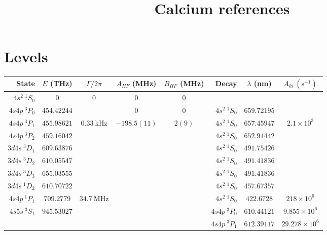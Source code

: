 \documentclass[aps,prx,10pt]{revtex4-2}
\begin{document}
\title{Calcium references}

\maketitle

\section{Levels}
\begin{longtable}{|r|c|c|c|c|r|c|c|}
\hline
State&$E$ (THz)&$\Gamma/2\pi$&$A_{HF}$ (MHz)&$B_{HF}$ (MHz)&Decay&$\lambda$ (nm)&$A_{ki}\ \mathrm{(s^{-1})}$\\
\hline
$4s^2\ {}^{\mathrm{1}}\!S_0$&$0$&$0$&$0$&$0$&&&\\
\hline
$4s4p\ {}^{\mathrm{3}}\!P_0$&$454.42244$&&$0$&$0$&$4s^2\ {}^{\mathrm{1}}\!S_0$&$659.72195$&\\
\hline
$4s4p\ {}^{\mathrm{3}}\!P_1$&$455.98621$&$0.33\ \mathrm{kHz}$\cite{machholmCalculationsPhys.Rev.A2001}&$-198.5(11)$\cite{klingbeilIsotopeZPhysikA1979}&$2(9)$\cite{klingbeilIsotopeZPhysikA1979}&$4s^2\ {}^{\mathrm{1}}\!S_0$&$657.45947$&$2.1\times10^3$\cite{machholmCalculationsPhys.Rev.A2001}\\
\hline
$4s4p\ {}^{\mathrm{3}}\!P_2$&$459.16042$&&&&$4s^2\ {}^{\mathrm{1}}\!S_0$&$652.91442$&\\
\hline
$3d4s\ {}^{\mathrm{3}}\!D_1$&$609.63876$&&&&$4s^2\ {}^{\mathrm{1}}\!S_0$&$491.75426$&\\
\hline
$3d4s\ {}^{\mathrm{3}}\!D_2$&$610.05547$&&&&$4s^2\ {}^{\mathrm{1}}\!S_0$&$491.41836$&\\
\hline
$3d4s\ {}^{\mathrm{3}}\!D_3$&$655.03555$&&&&$4s^2\ {}^{\mathrm{1}}\!S_0$&$491.41836$&\\
\hline
$3d4s\ {}^{\mathrm{1}}\!D_2$&$610.70722$&&&&$4s^2\ {}^{\mathrm{1}}\!S_0$&$457.67357$&\\
\hline
$4s4p\ {}^{\mathrm{1}}\!P_1$&$709.2779$\cite{machholmCalculationsPhys.Rev.A2001}&$34.7\ \mathrm{MHz}$\cite{machholmCalculationsPhys.Rev.A2001}&&&$4s^2\ {}^{\mathrm{1}}\!S_0$&$422.6728$\cite{machholmCalculationsPhys.Rev.A2001}&$218\times10^{6}$\cite{machholmCalculationsPhys.Rev.A2001}\\
\hline
\multirow{3}{*}{$4s5s\ {}^{\mathrm{3}}\!S_1$}&\multirow{3}{*}{$945.53027$}&\multirow{3}{*}{}&\multirow{3}{*}{}&\multirow{3}{*}{}&$4s4p\ {}^{\mathrm{3}}\!P_0$&$610.44121$&$9.855\times10^{6}$\cite{zhouMagicPhys.Rev.A2010}\\
\cline{6-8}
&&&&&$4s4p\ {}^{\mathrm{3}}\!P_1$&$612.39117$&$29.278\times10^{6}$\cite{zhouMagicPhys.Rev.A2010}\\

\end{longtable}
\end{document}
